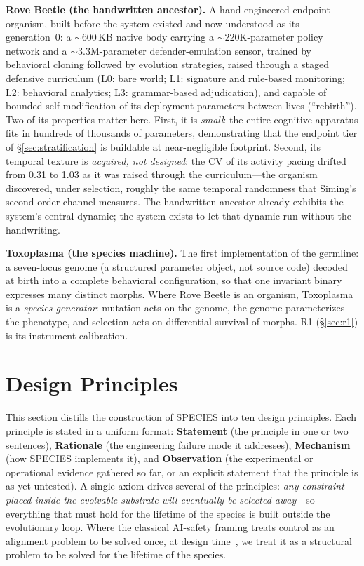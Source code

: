 \documentclass[11pt,a4paper]{article}
\begin{document}
\textbf{Rove Beetle (the handwritten ancestor).} A hand-engineered endpoint organism, built before the system existed and now understood as its generation~0: a $\sim$600\,KB native body carrying a $\sim$220K-parameter policy network and a $\sim$3.3M-parameter defender-emulation sensor, trained by behavioral cloning followed by evolution strategies, raised through a staged defensive curriculum (L0: bare world; L1: signature and rule-based monitoring; L2: behavioral analytics; L3: grammar-based adjudication), and capable of bounded self-modification of its deployment parameters between lives (``rebirth''). Two of its properties matter here. First, it is \emph{small}: the entire cognitive apparatus fits in hundreds of thousands of parameters, demonstrating that the endpoint tier of \S\ref{sec:stratification} is buildable at near-negligible footprint. Second, its temporal texture is \emph{acquired, not designed}: the CV of its activity pacing drifted from 0.31 to 1.03 as it was raised through the curriculum---the organism discovered, under selection, roughly the same temporal randomness that Siming's second-order channel measures. The handwritten ancestor already exhibits the system's central dynamic; the system exists to let that dynamic run without the handwriting.

\textbf{Toxoplasma (the species machine).} The first implementation of the germline: a seven-locus genome (a structured parameter object, not source code) decoded at birth into a complete behavioral configuration, so that one invariant binary expresses many distinct morphs. Where Rove Beetle is an organism, Toxoplasma is a \emph{species generator}: mutation acts on the genome, the genome parameterizes the phenotype, and selection acts on differential survival of morphs. R1 (\S\ref{sec:r1}) is its instrument calibration.

\section{Design Principles}
\label{sec:principles}

This section distills the construction of SPECIES into ten design principles. Each principle is stated in a uniform format: \textbf{Statement} (the principle in one or two sentences), \textbf{Rationale} (the engineering failure mode it addresses), \textbf{Mechanism} (how SPECIES implements it), and \textbf{Observation} (the experimental or operational evidence gathered so far, or an explicit statement that the principle is as yet untested). A single axiom drives several of the principles: \emph{any constraint placed inside the evolvable substrate will eventually be selected away}---so everything that must hold for the lifetime of the species is built outside the evolutionary loop. Where the classical AI-safety framing treats control as an alignment problem to be solved once, at design time~\cite{amodei2016concrete,russell2019humancompatible}, we treat it as a structural problem to be solved for the lifetime of the species.
\end{document}
